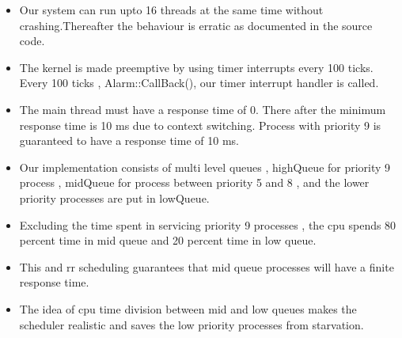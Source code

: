 \documentclass{article}
\begin{document}
\begin{itemize}
\item Our system can run upto 16 threads at the same time without crashing.Thereafter the behaviour is erratic as documented in the source code. 
\item The kernel is made preemptive by using timer interrupts every 100 ticks. Every 100 ticks , Alarm::CallBack(), our timer interrupt handler is called.
\item The main thread must have a response time of 0. There after the minimum response time is 10 ms due to context switching. Process with priority 9 is guaranteed to have a response time of 10 ms.
\item Our implementation consists of multi level queues , highQueue for priority 9 process , midQueue for process between priority 5 and 8 , and the lower priority processes are put in lowQueue.
\item Excluding the time spent in servicing priority 9 processes , the cpu spends 80 percent time in mid queue and 20 percent time in low queue.
\item This and rr scheduling guarantees that mid queue processes will have a finite response time.
\item The idea of cpu time division between mid and low queues makes the scheduler realistic and saves the low priority processes from starvation.
\end{itemize}
\end{document}
